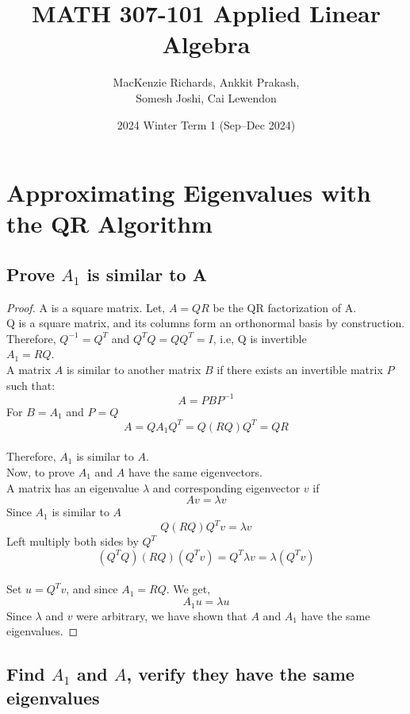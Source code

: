 \documentclass[12pt]{article}
\title{MATH 307-101
Applied Linear Algebra}
\author{MacKenzie Richards, Ankkit Prakash, \\ Somesh Joshi, Cai Lewendon}
\date{2024 Winter Term 1 (Sep–Dec 2024)}
\begin{document}
\maketitle
\section{Approximating Eigenvalues with the QR Algorithm}
\subsection{Prove $A_1$ is similar to A}
\begin{proof}
    A is a square matrix. Let, $A = QR$ be the QR factorization of A. \\
    Q is a square matrix, and its columns form an orthonormal basis by construction. \\
    Therefore, $Q^{-1} = Q^T$ and $Q^{T}Q = QQ^T = I$, i.e, Q is invertible\\
    $A_1 = RQ$.\\ 
    A matrix $A$ is similar to another matrix $B$ if there exists an invertible matrix $P$ such that:
    $$A = PBP^{-1}$$
    For $B = A_1$ and $P = Q$ \\
    $$A = QA_{1}Q^T = Q (RQ) Q^T = QR$$ \\
    Therefore, $A_1$ is similar to $A$. \\ 
    Now, to prove $A_1$ and $A$ have the same eigenvectors. \\
    A matrix has an eigenvalue $\lambda$ and corresponding eigenvector $v$ if \\
    $$Av = \lambda v$$
    Since $A_1$ is similar to $A$
    $$Q (RQ) Q^T v = \lambda v$$
    Left multiply both sides by $Q^T$
    $$ (Q^{T}Q) (RQ) (Q^{T}v) = Q^{T} \lambda v = \lambda (Q^{T}v)$$ \\
    Set $u = Q^{T} v$, and since $A_1 = RQ$. We get, \\
    $$ A_1 u = \lambda u$$
    Since $\lambda$ and $v$ were arbitrary, we have shown that $A$ and $A_1$ have the same eigenvalues.
\end{proof}
\subsection{Find $A_1$ and $A$, verify they have the same eigenvalues}
\end{document}
